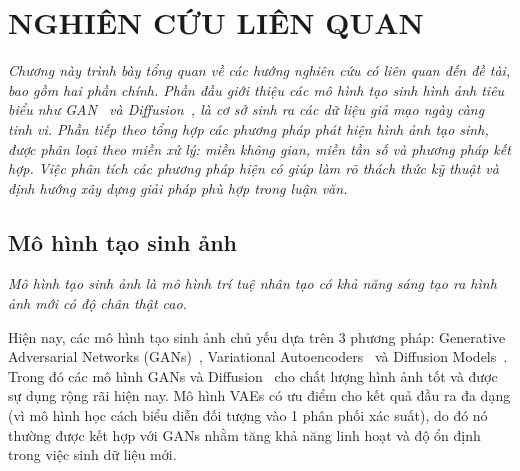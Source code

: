 \chapter{NGHIÊN CỨU LIÊN QUAN}
\label{Chapter2}
%
\textit{
Chương này trình bày tổng quan về các hướng nghiên cứu có liên quan đến đề tài, bao gồm hai phần chính. Phần đầu giới thiệu các mô hình tạo sinh hình ảnh tiêu biểu như GAN~\cite{Goodfellow2014GenerativeAN} và Diffusion~\cite{Ho2020DenoisingDP}, là cơ sở sinh ra các dữ liệu giả mạo ngày càng tinh vi. Phần tiếp theo tổng hợp các phương pháp phát hiện hình ảnh tạo sinh, được phân loại theo miền xử lý: miền không gian, miền tần số và phương pháp kết hợp. Việc phân tích các phương pháp hiện có giúp làm rõ thách thức kỹ thuật và định hướng xây dựng giải pháp phù hợp trong luận văn.
}\\
%
\section{Mô hình tạo sinh ảnh}
\textit{Mô hình tạo sinh ảnh là mô hình trí tuệ nhân tạo có khả năng sáng tạo ra hình ảnh mới có độ chân thật cao.}

Hiện nay, các mô hình tạo sinh ảnh chủ yếu dựa trên 3 phương pháp: Generative Adversarial Networks (GANs)~\cite{Goodfellow2014GenerativeAN}, Variational
 Autoencoders~\cite{Kingma2013AutoEncodingVB} và Diffusion Models~\cite{Ho2020DenoisingDP}. Trong đó các mô hình GANs\cite{Goodfellow2014GenerativeAN} và Diffusion~\cite{Ho2020DenoisingDP} cho chất lượng hình ảnh tốt và được sự dụng rộng rãi hiện nay. Mô hình VAEs có ưu điểm cho kết quả đầu ra đa dạng (vì mô hình học cách biểu diễn đối tượng vào 1 phân phối xác suất), do đó nó thường được kết hợp với GANs nhằm tăng khả năng linh hoạt và độ ổn định trong việc sinh dữ liệu mới.
